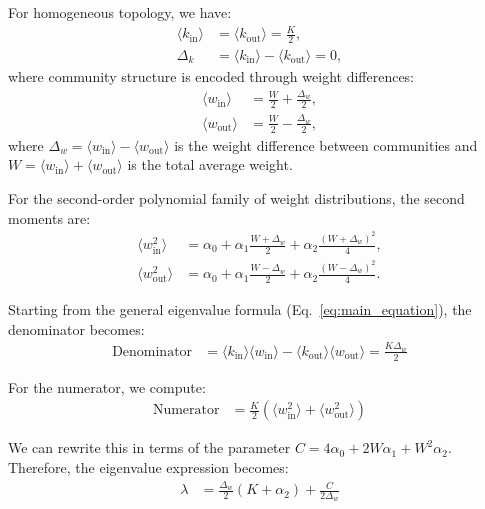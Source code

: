 \documentclass[a4paper,pre,superscriptaddress,floatfix,nofootinbib,twocolumn]{revtex4-1}
\begin{document}
For homogeneous topology, we have:
\begin{align*}
\langle k_{\text{in}} \rangle &= \langle k_{\text{out}} \rangle = \frac{K}{2},\\
\Delta_k &= \langle k_{\text{in}} \rangle - \langle k_{\text{out}} \rangle = 0,
\end{align*}
where community structure is encoded through weight differences:
\begin{align*}
\langle w_\text{in} \rangle &= \frac{W}{2} + \frac{\Delta_{w}}{2},\\
\langle w_\text{out} \rangle &= \frac{W}{2} - \frac{\Delta_{w}}{2},
\end{align*}
where $\Delta_{w} = \langle w_\text{in} \rangle - \langle w_\text{out} \rangle$ is the weight difference between communities and $W = \langle w_\text{in} \rangle + \langle w_\text{out} \rangle$ is the total average weight.

For the second-order polynomial family of weight distributions, the second moments are:
\begin{align*}
\langle w^2_\text{in} \rangle &= \alpha_0 + \alpha_1 \frac{W + \Delta_{w}}{2} + \alpha_2 \frac{(W + \Delta_{w})^2}{4},\\
\langle w^2_\text{out} \rangle &= \alpha_0 + \alpha_1 \frac{W - \Delta_{w}}{2} + \alpha_2 \frac{(W - \Delta_{w})^2}{4}.
\end{align*}

Starting from the general eigenvalue formula (Eq.~\eqref{eq:main_equation}), the denominator becomes:
\begin{align*}
\text{Denominator} &= \langle k_{\text{in}} \rangle \langle w_\text{in} \rangle - \langle k_{\text{out}} \rangle \langle w_\text{out} \rangle = \frac{K\Delta_{w}}{2}
\end{align*}

For the numerator, we compute:
\begin{align*}
\text{Numerator} &= \frac{K}{2} \left(\langle w^2_\text{in} \rangle + \langle w^2_\text{out} \rangle\right)
\end{align*}


We can rewrite this in terms of the parameter $C = 4\alpha_0 + 2W\alpha_1 + W^2\alpha_2$. Therefore, the eigenvalue expression becomes:
\begin{align*}
\lambda &= \frac{\Delta_{w}}{2}(K + \alpha_2) + \frac{C}{2\Delta_{w}}
\end{align*}
\end{document}
